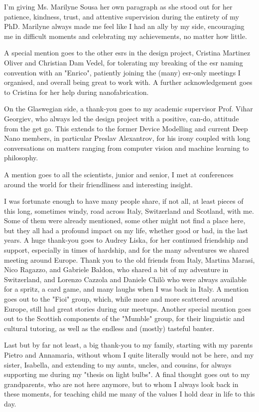 I'm giving Ms. Marilyne Sousa her own paragraph as she stood out for her patience, kindness, trust, and attentive supervision during the entirety of my PhD. Marilyne always made me feel like I had an ally by my side, encouraging me in difficult moments and celebrating my achievements, no matter how little.

A special mention goes to the other \acs{esr}s in the \acs{design} project, Cristina Martinez Oliver and Christian Dam Vedel, for tolerating my breaking of the \acs{esr} naming convention with an "Enrico", patiently joining the (many) \acs{esr}-only meetings I organised, and overall being great to work with. A further acknowledgement goes to Cristina for her help during nanofabrication.

On the Glaswegian side, a thank-you goes to my academic supervisor Prof. Vihar Georgiev, who always led the \acs{design} project with a positive, can-do, attitude from the get go. This extends to the former Device Modelling and current Deep Nano members, in particular Preslav Alexantrov, for his irony coupled with long conversations on matters ranging from computer vision and machine learning to philosophy.

A mention goes to all the scientists, junior and senior, I met at conferences around the world for their friendliness and interesting insight.

I was fortunate enough to have many people share, if not all, at least pieces of this long, sometimes windy, road across Italy, Switzerland and Scotland, with me. Some of them were already mentioned, some other might not find a place here, but they all had a profound impact on my life, whether good or bad, in the last years. A huge thank-you goes to Audrey Liska, for her continued friendship and support, especially in times of hardship, and for the many adventures we shared meeting around Europe. Thank you to the old friends from Italy, Martina Marasi, Nico Ragazzo, and Gabriele Baldon, who shared a bit of my adventure in Switzerland, and Lorenzo Cazzola and Daniele Chilò who were always available for a spritz, a card game, and many laughs when I was back in Italy. A mention goes out to the "Fioi" group, which, while more and more scattered around Europe, still had great stories during our meetups. Another special mention goes out to the Scottish components of the "Mumble" group, for their linguistic and cultural tutoring, as well as the endless and (mostly) tasteful banter.

Last but by far not least, a big thank-you to my family, starting with my parents Pietro and Annamaria, without whom I quite literally would not be here, and my sister, Isabella, and extending to my aunts, uncles, and cousins, for always supporting me during my "thesis on light bulbs". A final thought goes out to my grandparents, who are not here anymore, but to whom I always look back in these moments, for teaching child me many of the values I hold dear in life to this day.